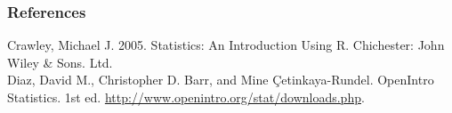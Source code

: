 \documentclass{beamer}\usepackage{graphicx, color}
\begin{document}
\begin{frame}[allowframebreaks]
  \frametitle{References}
  Crawley, Michael J. 2005. Statistics: An Introduction Using R. Chichester: John Wiley & Sons. Ltd. \\[0.25cm]
  Diaz, David M., Christopher D. Barr, and Mine \c{C}etinkaya-Rundel. OpenIntro Statistics. 1st ed. \url{http://www.openintro.org/stat/downloads.php}. \\[0.25cm] 
\end{frame}
\end{document}
